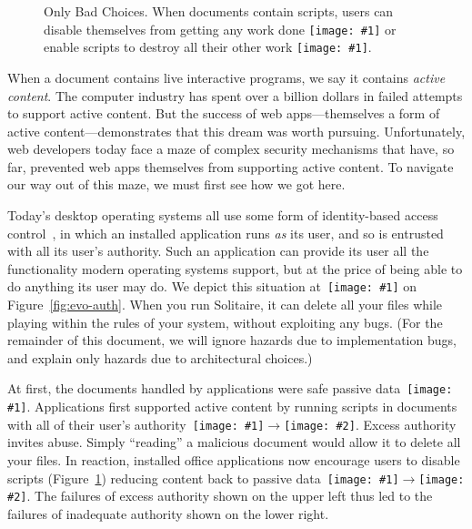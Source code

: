 \documentclass[letterpaper,twocolumn,10pt]{article}
\newcommand{\q}[1]{{\texttt{[image: \#1]}}}
\newcommand{\qq}[2]{{\texttt{[image: \#1]}}$\rightarrow${\texttt{[image: \#2]}}}
\begin{document}
\begin{figure}[t!]
  
\caption[Only Bad Choices.]{Only Bad Choices. When documents contain scripts, 
users can disable themselves from getting any work done \q{1} or enable 
scripts to destroy all their other work \q{2}.}
  \label{fig:dialog}
\end{figure}

When a document contains live interactive programs, we say it contains 
\emph{active content}. The computer industry has spent over a billion dollars 
in failed attempts to support active content. But the success of web 
apps---themselves a form of active content---demonstrates that this dream was 
worth pursuing. Unfortunately, web developers today face a maze of complex 
security mechanisms that have, so far, prevented web apps themselves from 
supporting active content. To navigate our way out of this maze, we must 
first see how we got here.

Today's desktop operating systems all use some form of identity-based access 
control~\cite{karp:abac-soa}, in which an installed application runs 
\emph{as} its user, and so is entrusted with all its user's authority. Such 
an application can provide its user all the functionality modern operating 
systems support, but at the price of being able to do anything its user may 
do. We depict this situation at~\q{2} on Figure~\ref{fig:evo-auth}. When you 
run Solitaire, it can delete all your files while playing within the rules of 
your system, without exploiting any bugs. (For the remainder of this document, 
we will ignore hazards due to implementation bugs, and explain only hazards 
due to architectural choices.)

At first, the documents handled by applications were safe passive data~\q{1}. 
Applications first supported active content by running scripts in documents 
with all of their user's authority~\qq{1}{2}. Excess authority invites abuse. 
Simply ``reading'' a malicious document would allow it to delete all your 
files. In reaction, installed office applications now encourage users to 
disable scripts (Figure~\ref{fig:dialog}) reducing content back to passive 
data~\qq{2}{1}. The failures of excess authority shown on the upper left thus 
led to the failures of inadequate authority shown on the lower right.
\end{document}
